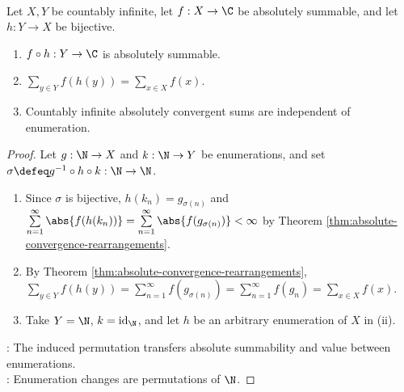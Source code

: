 \begin{theorem} \label{thm:absolute-countable-sums-well-defined} \\
Let $X,Y$ be countably infinite, let $f:X\to\C$ be absolutely summable, and let $h:Y\to X$ be bijective.
\begin{enumerate}[label=(\roman*)]
\setlength{\itemsep}{0pt}
\item $f\circ h:Y\to\C$ is absolutely summable.
\item $\sum\limits_{y\in Y}f(h(y))=\sum\limits_{x\in X}f(x)$.
\item Countably infinite absolutely convergent sums are independent of enumeration.
\end{enumerate}
\begin{proof}
Let $g:\N\to X$ and $k:\N\to Y$ be enumerations, and set $\sigma\defeq g^{-1}\circ h\circ k:\N\to\N$.\\
\begin{enumerate}[label=(\roman*)]
\setlength{\itemsep}{0pt}
\item Since $\sigma$ is bijective, $h(k_n)=g_{\sigma(n)}$ and $\sum\limits_{n=1}^{\infty}\abs{f(h(k_n))}=\sum\limits_{n=1}^{\infty}\abs{f(g_{\sigma(n)})}<\infty$ by Theorem \ref{thm:absolute-convergence-rearrangements}.
\item By Theorem \ref{thm:absolute-convergence-rearrangements}, $\sum\limits_{y\in Y}f(h(y))=\sum\limits_{n=1}^{\infty}f(g_{\sigma(n)})=\sum\limits_{n=1}^{\infty}f(g_n)=\sum\limits_{x\in X}f(x)$.
\item Take $Y=\N$, $k=\operatorname{id}_{\N}$, and let $h$ be an arbitrary enumeration of $X$ in (ii).
\end{enumerate}
: The induced permutation transfers absolute summability and value between enumerations.\\
: Enumeration changes are permutations of $\N$.
\end{proof}
\end{theorem}

